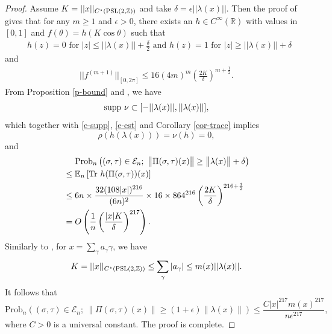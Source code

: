 \documentclass{amsart}
\theoremstyle{plain}
\theoremstyle{definition}
\theoremstyle{remark}
\begin{document}
\begin{proof}
    Assume $K=||x||_{C^\star(\textnormal{PSL}(2,\mathbb{Z}))}$ and take $\delta=\epsilon||\lambda(x)||$. Then the proof of \cite[Lemma 4.10]{CGVTvH24} gives that for any $m\geq 1$ and $\epsilon>0$, there exists an $h\in C^\infty(\mathbb{R})$ with values in $[0,1]$ and $f(\theta)=h(K\cos\theta)$ such that
    \begin{align}\label{e-supp}
    \text{ $h(z)=0$ for $|z|\leq ||\lambda(x)||+\frac{\delta}{2}$ and $h(z)=1$ for $|z|\geq ||\lambda(x)||+\delta$}
        \end{align}
        and
        \begin{align}\label{e-est}
       \text{$||f^{(m+1)}||_{[0,2\pi]}\leq 16(4m)^m\left(\frac{2K}{\delta}\right)^{m+\frac{1}{2}}$.}
        \end{align}
        From Proposition \ref{p-bound} and \cite[Lemma 4.9]{CGVTvH24}, we have $$\textnormal{supp }\nu\subset[-||\lambda(x)||,||\lambda(x)||],$$ which together with \eqref{e-supp}, \eqref{e-est} and Corollary \ref{cor-trace} implies $$\rho(h(\lambda(x)))=\nu(h)=0,$$ and
    \begin{align*}
        &\ \ \ \ \mathrm{Prob}_n \left( (\sigma,\tau)\in\mathcal{E}_n;\ \big\|\Pi(\sigma,\tau)(x)\big\| \geq  \big\|\lambda(x)\big\|+\delta \right)\\
        &\leq \mathbb{E}_n\left[\textnormal{Tr\ } h( \Pi(\sigma,\tau))(x)\right]\\
        &\leq 6n\times\frac{32(108|x|)^{216}}{(6n)^2}\times 16\times864^{216}\left(\frac{2K}{\delta}\right)^{216+\frac{1}{2}}\\ &=O\left(\frac{1}{n}\left(\frac{|x|K}{\delta}\right)^{217}\right).
    \end{align*}
       Similarly to \cite[Equation (3.3)]{MPvH25}, for $x=\sum\limits_{\gamma} a_\gamma\gamma$, we have
       $$K=||x||_{C^\star(\textnormal{PSL}(2,\mathbb{Z}))}\leq \sum\limits_{\gamma}|a_{\gamma}|\leq m(x)||\lambda(x)||.$$
       It follows that
    $$\mathrm{Prob}_n \left( (\sigma,\tau)\in\mathcal{E}_n;\ \big\|\Pi(\sigma,\tau)(x)\big\| \geq  (1+\epsilon)\big\|\lambda(x)\big\| \right)\leq\frac{C|x|^{217}m(x)^{217}}{n\epsilon^{217}},$$
    where $C>0$ is a universal constant. The proof is complete.
\end{proof}
\end{document}
